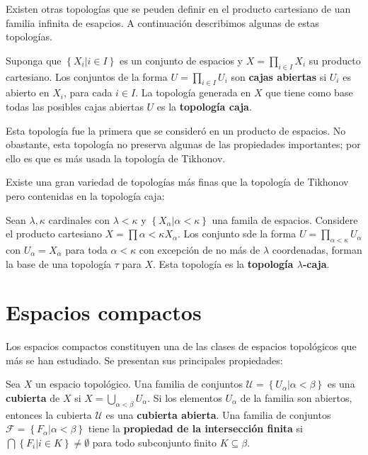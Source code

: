 \documentclass[12pt]{report}
\theoremstyle{largebreak}
\begin{document}
    Existen otras topologías que se peuden definir en el producto cartesiano de uan familia infinita de esapcios. A continuación describimos algunas de estas topologías.

    \begin{mydef}
        Suponga que $\left\{X_i\big|i\in I \right\}$ es un conjunto de espacios y $X=\prod_{i\in I}X_i$ su producto cartesiano. Los conjuntos de la forma $U=\prod_{i\in I}U_i$ son \textbf{cajas abiertas} si $U_i$ es abierto en $X_i$, para cada $i\in I$. La topología generada en $X$ que tiene como base todas las posibles cajas abiertas $U$ es la \textbf{topología caja}.
    \end{mydef}

    Esta topología fue la primera que se consideró en un producto de espacios. No obastante, esta topología no preserva algunas de las propiedades importantes; por ello es que es más usada la topología de Tikhonov.

    Existe una gran variedad de topologías más finas que la topología de Tikhonov pero contenidas en la topología caja:

    \begin{mydef}
        Sean $\lambda,\kappa$ cardinales con $\lambda<\kappa$ y $\left\{X_\alpha\big|\alpha<\kappa \right\}$ una famila de espacios. Considere el producto cartesiano $X=\prod{\alpha<\kappa}X_\alpha$. Los conjunto sde la forma $U=\prod_{\alpha<\kappa}U_\alpha$ con $U_\alpha=X_\alpha$ para toda $\alpha<\kappa$ con excepción de no más de $\lambda$ coordenadas, forman la base de una topología $\tau$ para $X$. Esta topología es la \textbf{topología $\lambda$-caja}.
    \end{mydef}

    \section{Espacios compactos}

    Los espacios compactos constituyen una de las clases de espacios topológicos que más se han estudiado. Se presentan sus principales propiedades:

    \begin{mydef}
        Sea $X$ un espacio topológico. Una familia de conjuntos $\mathcal{U}=\left\{U_\alpha\big|\alpha<\beta \right\}$ es una \textbf{cubierta} de $X$ si $X=\bigcup_{\alpha<\beta}U_\alpha$. Si los elementos $U_\alpha$ de la familia son abiertos, entonces la cubierta $\mathcal{U}$ es una \textbf{cubierta abierta}. Una familia de conjuntos $\mathcal{F}=\left\{F_\alpha\big|\alpha<\beta \right\}$ tiene la \textbf{propiedad de la intersección finita} si $\bigcap\left\{F_i\big|i\in K \right\}\neq\emptyset$ para todo subconjunto finito $K\subseteq\beta$.
    \end{mydef}
\end{document}
